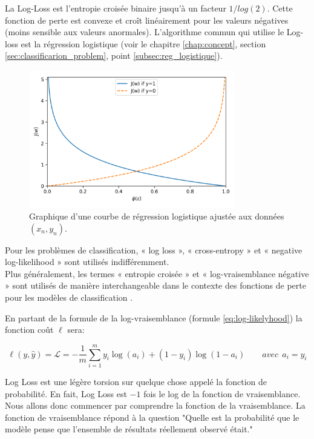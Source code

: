 		La Log-Loss est l'entropie croisée binaire jusqu'à un facteur ${1}/{log(2)}$. Cette fonction de perte est convexe et croît linéairement pour les valeurs négatives (moins sensible aux valeurs anormales). L'algorithme commun qui utilise le Log-loss est la régression logistique (voir le chapitre \ref{chap:concept}, section \ref{sec:classificarion_problem}, point \ref{subsec:reg_logistique}).
		
		
		\begin{figure}[H]%
			\centering
			\includegraphics[width=9cm]{images/minimum_log_curve.png}
			\caption[Graphique d'une courbe de régression logistique ajustée aux données $(x_n , y_n)$.]{
				Graphique d'une courbe de régression logistique ajustée aux données $(x_n , y_n)$. 
				\cite{ml2008python}
			}
			\label{fig:minimum_log_curve}
		\end{figure}
	
		Pour les problèmes de classification, « log loss », « cross-entropy » et « negative log-likelihood » sont utilisés indifféremment.\\
		Plus généralement, les termes « entropie croisée » et « log-vraisemblance négative » sont utilisés de manière interchangeable dans le contexte des fonctions de perte pour les modèles de classification \cite{bishop2006pattern, goodfellow2016deep}.
		
		En partant de la formule de la log-vraisemblance (formule \ref{eq:log-likelyhood}) la fonction coût $\ell$ sera:
		
		\begin{equation}\label{eq:log-loss}
			\ell(y,\hat{y}) = \mathcal{L} = -\frac{1}{m}\sum_{i=1}^{m} {y_i}\log( {a_i}) +{(1-y_i)}\log(1-a_i) 
			\qquad avec \ \ a_i = \hat{y_i}
		\end{equation}

		
		Log Loss est une légère torsion sur quelque chose appelé la fonction de probabilité. En fait, Log Loss est $ -1 $ fois le log de la fonction de vraisemblance. Nous allons donc commencer par comprendre la fonction de la  vraisemblance.
		La fonction de vraisemblance répond à la question "Quelle est la probabilité que le modèle pense que l'ensemble de résultats réellement observé était."
		
